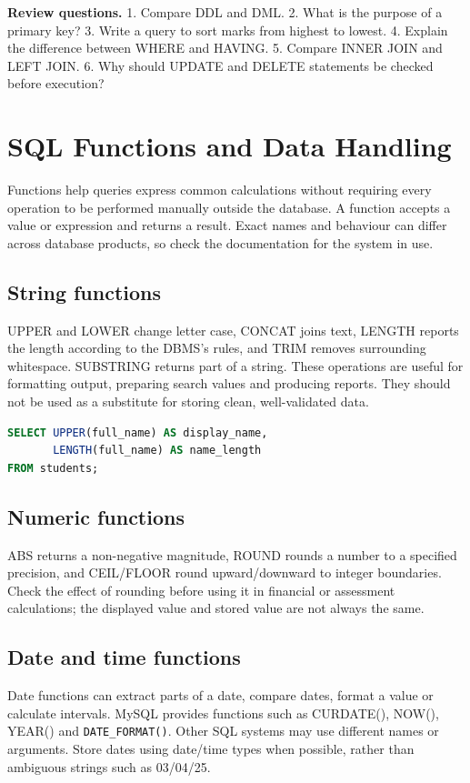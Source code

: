 \documentclass[11pt,openany,oneside]{book}
\newcommand{\exampractice}[1]{\begin{tcolorbox}[colback=LightGold,colframe=Gold,boxrule=.6pt,arc=1.2mm,left=2mm,right=2mm,top=1mm,bottom=1mm]\textbf{Review questions.} #1\end{tcolorbox}}
\begin{document}
\exampractice{1. Compare DDL and DML. 2. What is the purpose of a primary key? 3. Write a query to sort marks from highest to lowest. 4. Explain the difference between WHERE and HAVING. 5. Compare INNER JOIN and LEFT JOIN. 6. Why should UPDATE and DELETE statements be checked before execution?}

\chapter{SQL Functions and Data Handling}
Functions help queries express common calculations without requiring every operation to be performed manually outside the database. A function accepts a value or expression and returns a result. Exact names and behaviour can differ across database products, so check the documentation for the system in use.

\section{String functions}
UPPER and LOWER change letter case, CONCAT joins text, LENGTH reports the length according to the DBMS's rules, and TRIM removes surrounding whitespace. SUBSTRING returns part of a string. These operations are useful for formatting output, preparing search values and producing reports. They should not be used as a substitute for storing clean, well-validated data.

\begin{lstlisting}[style=webcode,language=SQL]
SELECT UPPER(full_name) AS display_name,
       LENGTH(full_name) AS name_length
FROM students;
\end{lstlisting}

\section{Numeric functions}
ABS returns a non-negative magnitude, ROUND rounds a number to a specified precision, and CEIL/FLOOR round upward/downward to integer boundaries. Check the effect of rounding before using it in financial or assessment calculations; the displayed value and stored value are not always the same.

\section{Date and time functions}
Date functions can extract parts of a date, compare dates, format a value or calculate intervals. MySQL provides functions such as CURDATE(), NOW(), YEAR() and \texttt{DATE\_FORMAT()}. Other SQL systems may use different names or arguments. Store dates using date/time types when possible, rather than ambiguous strings such as 03/04/25.
\end{document}
